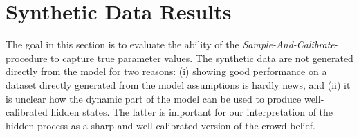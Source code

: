 \documentclass[aoas, preprint]{imsart}
\numberwithin{equation}{section}
\theoremstyle{plain}
\begin{document}

\section{Synthetic Data Results}
\label{syntheticData}

The goal in this section is to evaluate the ability of the \textit{Sample-And-Calibrate}-procedure to capture true parameter values. The synthetic data are not generated directly from the model for two reasons: (i) showing good performance on a dataset directly generated from the model assumptions is hardly news, and (ii) it is unclear how the dynamic part of the model can be used to produce well-calibrated hidden states. The latter is important for our interpretation of the hidden process as a sharp and well-calibrated version of the crowd belief. 
\end{document}
